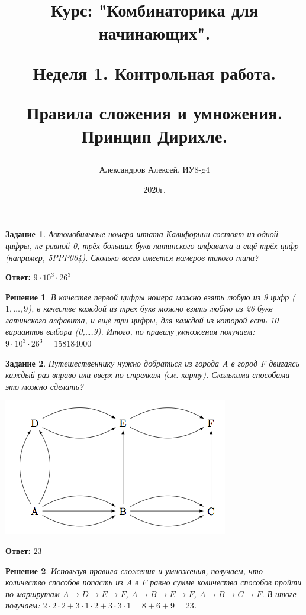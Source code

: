 \documentclass[a4paper,oneside]{memoir}
\title{Курс: "Комбинаторика для начинающих".
	
Неделя 1. Контрольная работа.
	 
Правила сложения и умножения. Принцип Дирихле.}
\author{Александров Алексей, ИУ8-g4}
\date{2020г.}
\newtheorem{task}{Задание}
\newtheorem{solution}{Решение}
\begin{document}
	
\maketitle

\begin{task}
	Автомобильные номера штата Калифорнии состоят из одной цифры, не равной 0, трёх больших букв латинского алфавита и ещё трёх цифр (например, 5PPP064). Сколько всего имеется номеров такого типа?
\end{task}

\textbf{Ответ:} $ 9 \cdot 10^{3} \cdot 26^{3} $

\begin{solution}
В качестве первой цифры номера можно взять любую из 9 цифр ($ {1,…,9} $), в качестве каждой из трех букв можно взять любую из 26 букв латинского алфавита, и ещё три цифры, для каждой из которой есть 10 вариантов выбора ({0,…,9}). Итого, по правилу умножения получаем: $ 9 \cdot 10^3 \cdot 26^3 = 158184000 $
\end{solution}

\hrulefill

\begin{task}
Путешественнику нужно добраться из города A в город F двигаясь каждый раз вправо или вверх по стрелкам (см. карту). Сколькими способами это можно сделать?

\includegraphics[scale=0.5]{src/roads}

\end{task}

\textbf{Ответ:} $ 23 $

\begin{solution}
	Используя правила сложения и умножения, получаем, что количество способов попасть из $A$ в $F$ равно сумме количества способов пройти по маршрутам $A \rightarrow D \rightarrow E \rightarrow F$, $A \rightarrow B \rightarrow E \rightarrow F$, $A \rightarrow B \rightarrow C \rightarrow F$. В итоге получаем: $2\cdot2\cdot2 + 3\cdot1\cdot2 + 3\cdot3\cdot1 = 8 + 6 + 9 = 23 $.
\end{solution}
\end{document}
